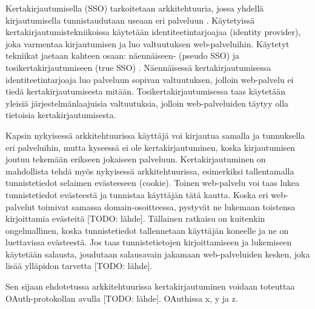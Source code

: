 Kertakirjautumisella (SSO) tarkoitetaan arkkitehtuuria, jossa yhdellä kirjautumisella tunnistaudutaan useaan eri palveluun \cite{sso}. Käytetyissä kertakirjautumistekniikoissa käytetään identiteetintarjoajaa (identity provider), joka varmentaa kirjautumisen ja luo valtuutuksen web-palveluihin. Käytetyt tekniikat jaetaan kahteen osaan: näennäiseen- (pseudo SSO) ja tosikertakirjautumiseen (true SSO) \cite{sso}. Näennäisessä kertakirjautumisessa identiteetintarjoaja luo palveluun sopivan valtuutuksen, jolloin web-palvelu ei tiedä kertakirjautumisesta mitään. Tosikertakirjautumisessa taas käytetään yleisiä järjestelmänlaajuisia valtuutuksia, jolloin web-palveluiden täytyy olla tietoisia kertakirjautumisesta.

Kapsin nykyisessä arkkitehtuurissa käyttäjä voi kirjautua samalla ja tunnuksella eri palveluihin, mutta kyseessä ei ole kertakirjautuminen, koska kirjautumisen joutuu tekemään erikseen jokaiseen palveluun. Kertakirjautuminen on mahdollista tehdä myös nykyisessä arkkitehtuurissa, esimerkiksi tallentamalla tunnistetiedot selaimen evästeeseen (cookie). Toinen web-palvelu voi taas lukea tunnistetiedot evästeestä ja tunnistaa käyttäjän tätä kautta. Koska eri web-palvelut toimivat samassa domain-osoitteessa, pystyvät ne lukemaan toistensa kirjoittamia evästeitä [TODO: lähde]. Tällainen ratkaisu on kuitenkin ongelmallinen, koska tunnistetiedot tallennetaan käyttäjän koneelle ja ne on luettavissa evästeestä. Jos taas tunnistetietojen kirjoittamiseen ja lukemiseen käytetään salausta, joudutaan salausavain jakamaan web-palveluiden kesken, joka lisää ylläpidon tarvetta [TODO: lähde].

Sen sijaan ehdotetussa arkkitehtuurissa kertakirjautuminen voidaan toteuttaa OAuth-protokollan avulla [TODO: lähde]. OAuthissa x, y ja z.